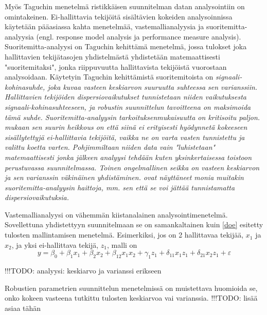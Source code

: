 \documentclass[12pt,a4paper,finnish]{tutthesis}
\newcommand\todo[1]{{\color{red}!!!TODO: #1}} %
\begin{document}
Myös Taguchin menetelmä ristikkäisen suunnitelman datan analysointiin on
omintakeinen. Ei-hallittavia tekijöitä sisältävien kokeiden analysoinnissa
käytetään pääasiassa kahta menetelmää, vastemallianalyysia ja suoritemitta-analyysia
(engl. response model analysis ja performance measure analysis).
Suoritemitta-analyysi on Taguchin kehittämä menetelmä, jossa
tulokset joka hallittavien tekijätasojen yhdistelmästä yhdistetään matemaattisesti
"suoritemitaksi", jonka riippuvuutta hallittavista tekijöistä vuorostaan
analysoidaan. Käytetyin Taguchin kehittämistä suoritemitoista on
\em signaali-kohinasuhde, \em joka kuvaa vasteen keskiarvon suuruutta suhteessa
sen varianssiin. Hallittavien tekijöiden dispersiovaikutukset tunnistetaan
niiden vaikutuksesta signaali-kohinasuhteeseen, ja robustin suunnittelun
tavoitteena on maksimoida tämä suhde.
Suoritemitta-analyysin tarkoituksenmukaisuutta on kritisoitu paljon.
\textcite{Bursztyn} mukaan sen suurin heikkous on että siinä ei
erityisesti hyödynnetä kokeeseen sisällytettyjä ei-hallittavia tekijöitä,
vaikka ne on varta vasten tunnistettu ja valittu koetta varten. Pohjimmiltaan
niiden data vain "luhistetaan" matemaattisesti jonka jälkeen analyysi
tehdään kuten yksinkertaisessa toistoon perustuvassa suunnitelmassa.
Toinen ongelmallinen seikka on vasteen keskiarvon ja sen varianssin
väkinäinen yhdistäminen.
\textcite{box1988,steinberg1994} ovat näyttäneet monia muitakin suoritemitta-analyysin
haittoja, mm. sen että se voi jättää tunnistamatta dispersiovaikutuksia.

Vastemallianalyysi on vähemmän kiistanalainen analysointimenetelmä.
Sovellettuna yhdistettyyn suunnitelmaan se on samankaltainen kuin
\ref{doe} esitetty tulosten mallintamisen
menetelmä. Esimerkiksi, jos on 2 hallittavaa tekijää, $x_1$ ja $x_2$, ja yksi
ei-hallittava tekijä, $z_1$, malli on
\[y = \beta _0 + \beta _{1}x_1 + \beta _{2}x_2 + \beta _{12}x_{1}x_{2} + \gamma _{1}z_1 + \delta _{11}x_{1}z_{1} + \delta _{21}x_{2}z_1 + \varepsilon \]

\todo{analyysi: keskiarvo ja varianssi erikseen}

Robustien parametrien suunnittelun menetelmissä on muistettava
huomioida se, onko kokeen vasteena tutkittu tulosten keskiarvoa vai
varianssia. \todo{lisää asiaa tähän}
\end{document}
